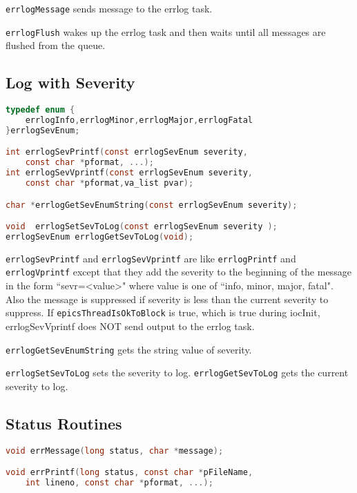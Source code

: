 \verb|errlogMessage| sends message to the errlog task.

\verb|errlogFlush| wakes up the errlog task and then waits until all messages are flushed from the queue.

\subsection{Log with Severity}

\begin{lstlisting}[language=C]
typedef enum {
    errlogInfo,errlogMinor,errlogMajor,errlogFatal
}errlogSevEnum;

int errlogSevPrintf(const errlogSevEnum severity,
    const char *pformat, ...);
int errlogSevVprintf(const errlogSevEnum severity,
    const char *pformat,va_list pvar);

char *errlogGetSevEnumString(const errlogSevEnum severity);

void  errlogSetSevToLog(const errlogSevEnum severity );
errlogSevEnum errlogGetSevToLog(void);
\end{lstlisting}

\verb|errlogSevPrintf| and \verb|errlogSevVprintf| are like \verb|errlogPrintf| and  \verb|errlogVprintf| except that they add the severity to the beginning of the message in the form ``sevr=\textless{}value\textgreater{}" where value is one of ``info, minor, major, fatal".
Also the message is suppressed if  severity is less than the current severity to suppress.
If \verb|epicsThreadIsOkToBlock| is true, which is true during iocInit, errlogSevVprintf does NOT send output to the errlog task.

\verb|errlogGetSevEnumString| gets the string value of severity.

\verb|errlogSetSevToLog| sets the severity to log.
\verb|errlogGetSevToLog| gets the current severity to log.

\subsection{Status Routines }

\begin{lstlisting}[language=C]
void errMessage(long status, char *message);

void errPrintf(long status, const char *pFileName,
    int lineno, const char *pformat, ...);
\end{lstlisting}

